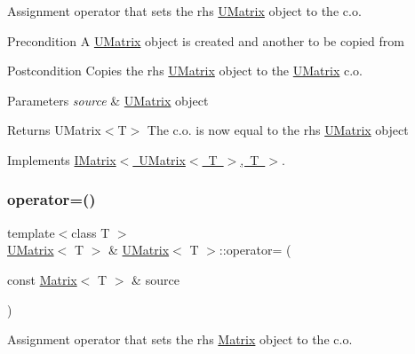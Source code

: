 Assignment operator that sets the rhs \mbox{\hyperlink{class_u_matrix}{U\+Matrix}} object to the c.\+o. 

\begin{DoxyPrecond}{Precondition}
A \mbox{\hyperlink{class_u_matrix}{U\+Matrix}} object is created and another to be copied from 
\end{DoxyPrecond}
\begin{DoxyPostcond}{Postcondition}
Copies the rhs \mbox{\hyperlink{class_u_matrix}{U\+Matrix}} object to the \mbox{\hyperlink{class_u_matrix}{U\+Matrix}} c.\+o. 
\end{DoxyPostcond}

\begin{DoxyParams}{Parameters}
{\em source} & \mbox{\hyperlink{class_u_matrix}{U\+Matrix}} object \\
\hline
\end{DoxyParams}
\begin{DoxyReturn}{Returns}
U\+Matrix$<$\+T$>$ The c.\+o. is now equal to the rhs \mbox{\hyperlink{class_u_matrix}{U\+Matrix}} object 
\end{DoxyReturn}


Implements \mbox{\hyperlink{class_i_matrix_a9eeb68de7e1d37d1aab439c78fea9be3}{I\+Matrix$<$ U\+Matrix$<$ T $>$, T $>$}}.

\mbox{\label{class_u_matrix_a98d77665ae6c6dd8c264d7aca57d76fd}} 
\subsubsection{\texorpdfstring{operator=()}{operator=()}\hspace{0.1cm}{\footnotesize\ttfamily [2/2]}}
{\footnotesize\ttfamily template$<$class T $>$ \\
\mbox{\hyperlink{class_u_matrix}{U\+Matrix}}$<$ T $>$ \& \mbox{\hyperlink{class_u_matrix}{U\+Matrix}}$<$ T $>$\+::operator= (\begin{DoxyParamCaption}\item[{const \mbox{\hyperlink{class_matrix}{Matrix}}$<$ T $>$ \&}]{source }\end{DoxyParamCaption})}



Assignment operator that sets the rhs \mbox{\hyperlink{class_matrix}{Matrix}} object to the c.\+o. 

